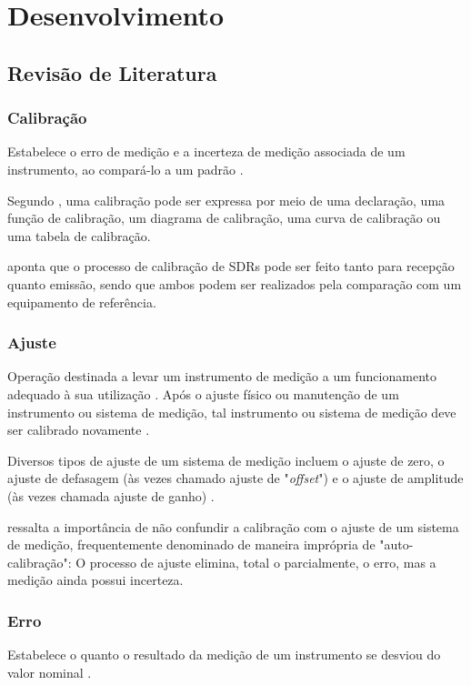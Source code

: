 \chapter{Desenvolvimento}

\section{Revisão de Literatura}

\subsection{Calibração}
Estabelece o erro de medição e a incerteza de medição associada de
um instrumento, ao compará-lo a um padrão \cite{slidesCalibracaoLacen}.


Segundo , uma calibração pode ser expressa por meio de uma declaração, uma função de calibração, um diagrama de calibração, uma curva de calibração ou uma tabela de calibração.

 aponta que o processo de calibração de SDRs pode ser feito tanto para recepção quanto emissão, sendo que ambos podem ser realizados pela comparação com um equipamento de referência.


\subsection{Ajuste}
Operação destinada a levar um instrumento de medição a um funcionamento adequado à sua utilização \cite{slidesCalibracaoPaulo}. Após o ajuste físico ou manutenção de um instrumento ou sistema de medição, tal instrumento ou sistema de medição deve ser calibrado novamente \cite{slidesCalibracaoLacen}.

Diversos tipos de ajuste de um sistema de medição incluem o ajuste de zero, o
ajuste de defasagem (às vezes chamado ajuste de "\textit{offset}") e o ajuste de amplitude (às vezes chamada ajuste de ganho) \cite{VIM}.


 ressalta a importância de não confundir a calibração com o ajuste de um sistema de medição, frequentemente denominado de maneira imprópria de "auto-calibração": O processo de ajuste elimina, total o parcialmente, o erro, mas a medição ainda possui incerteza.


\subsection{Erro}
Estabelece o quanto o resultado da medição de um instrumento se desviou
do valor nominal \cite{slidesCalibracaoLacen}.


